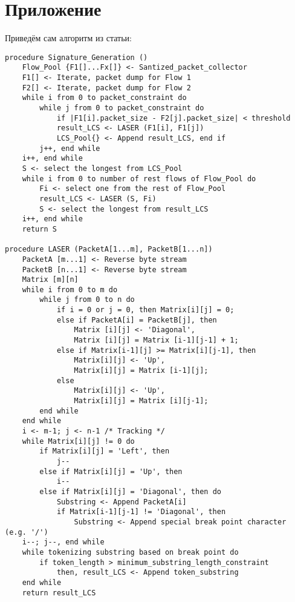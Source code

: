 \section*{Приложение}
\label{sec:Apendix} 

Приведём сам алгоритм из статьи:

\begin{lstlisting}[language=PL/I, caption=Алгоритм LASER]
procedure Signature_Generation ()
    Flow_Pool {F1[]...Fx[]} <- Santized_packet_collector
    F1[] <- Iterate, packet dump for Flow 1
    F2[] <- Iterate, packet dump for Flow 2
    while i from 0 to packet_constraint do
        while j from 0 to packet_constraint do
            if |F1[i].packet_size - F2[j].packet_size| < threshold
            result_LCS <- LASER (F1[i], F1[j])
            LCS_Pool{} <- Append result_LCS, end if
        j++, end while
    i++, end while
    S <- select the longest from LCS_Pool
    while i from 0 to number of rest flows of Flow_Pool do
        Fi <- select one from the rest of Flow_Pool
        result_LCS <- LASER (S, Fi)
        S <- select the longest from result_LCS
    i++, end while
    return S

procedure LASER (PacketA[1...m], PacketB[1...n])
    PacketA [m...1] <- Reverse byte stream
    PacketB [n...1] <- Reverse byte stream
    Matrix [m][n]
    while i from 0 to m do
        while j from 0 to n do
            if i = 0 or j = 0, then Matrix[i][j] = 0;
            else if PacketA[i] = PacketB[j], then
                Matrix [i][j] <- 'Diagonal',
                Matrix [i][j] = Matrix [i-1][j-1] + 1;
            else if Matrix[i-1][j] >= Matrix[i][j-1], then
                Matrix[i][j] <- 'Up',
                Matrix[i][j] = Matrix [i-1][j];
            else
                Matrix[i][j] <- 'Up',
                Matrix[i][j] = Matrix [i][j-1];
        end while
    end while
    i <- m-1; j <- n-1 /* Tracking */
    while Matrix[i][j] != 0 do
        if Matrix[i][j] = 'Left', then
            j--
        else if Matrix[i][j] = 'Up', then
            i--
        else if Matrix[i][j] = 'Diagonal', then do
            Substring <- Append PacketA[i]
            if Matrix[i-1][j-1] != 'Diagonal', then
                Substring <- Append special break point character (e.g. '/')
    i--; j--, end while
    while tokenizing substring based on break point do
        if token_length > minimum_substring_length_constraint
            then, result_LCS <- Append token_substring
    end while
    return result_LCS
\end{lstlisting}


